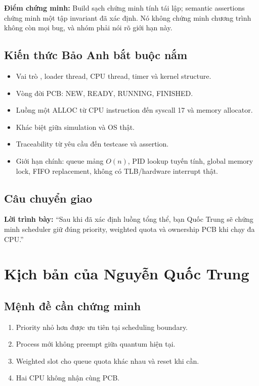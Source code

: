 \documentclass[12pt,a4paper]{article}
\newcommand{\code}[1]{\texttt{\detokenize{#1}}}
\newcommand{\say}[1]{\textbf{\color{bkblue}Lời trình bày:} ``#1''}
\newcommand{\proofpoint}[1]{\textbf{\color{bkgold}Điểm chứng minh:} #1}
\begin{document}
\proofpoint{Build sạch chứng minh tính tái lập; semantic assertions chứng minh
một tập invariant đã xác định. Nó không chứng minh chương trình không còn mọi
bug, và nhóm phải nói rõ giới hạn này.}

\subsection{Kiến thức Bảo Anh bắt buộc nắm}

\begin{itemize}
  \item Vai trò \code{main()}, loader thread, CPU thread, timer và kernel
  structure.
  \item Vòng đời PCB: NEW, READY, RUNNING, FINISHED.
  \item Luồng một ALLOC từ CPU instruction đến syscall 17 và memory allocator.
  \item Khác biệt giữa simulation và OS thật.
  \item Traceability từ yêu cầu đến testcase và assertion.
  \item Giới hạn chính: queue mảng \(O(n)\), PID lookup tuyến tính, global
  memory lock, FIFO replacement, không có TLB/hardware interrupt thật.
\end{itemize}

\subsection{Câu chuyển giao}

\say{Sau khi đã xác định luồng tổng thể, bạn Quốc Trung sẽ chứng minh scheduler
giữ đúng priority, weighted quota và ownership PCB khi chạy đa CPU.}

\section{Kịch bản của Nguyễn Quốc Trung}

\subsection{Mệnh đề cần chứng minh}

\begin{enumerate}
  \item Priority nhỏ hơn được ưu tiên tại scheduling boundary.
  \item Process mới không preempt giữa quantum hiện tại.
  \item Weighted slot cho queue quota khác nhau và reset khi cần.
  \item Hai CPU không nhận cùng PCB.
\end{enumerate}
\end{document}
